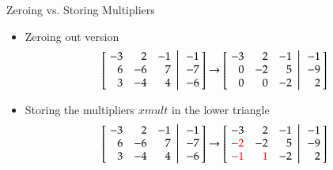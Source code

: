 \documentclass[10pt]{beamer}
\begin{document}
\begin{frame}[fragile]{Zeroing vs. Storing Multipliers}

\begin{itemize}
    \item Zeroing out version 
    $$
      \left[
           \left.\negthickspace\begin{array}{rrr}  -3 &  2 & -1  \\
                                                    6 & -6 &  7 \\
                                                    3 & -4 &  4 \end{array}
           \right|\begin{array}{r} -1 \\ -7 \\ -6 \end{array}\negthickspace\right]\rightarrow \left[
           \left.\negthickspace\begin{array}{rrr}  -3 &  2 & -1 \\
                                                    0 & -2 &  5 \\
                                                    0 &  0 & -2 \end{array}
           \right|\begin{array}{r} -1 \\ -9 \\ 2 \end{array}\negthickspace\right]
    $$
    \item Storing the multipliers $xmult$ in the lower triangle
    $$
      \left[
           \left.\negthickspace\begin{array}{rrr}  -3 &  2 & -1  \\
                                                    6 & -6 &  7 \\
                                                    3 & -4 &  4 \end{array}
           \right|\begin{array}{r} -1 \\ -7 \\ -6 \end{array}\negthickspace\right]\rightarrow \left[
           \left.\negthickspace\begin{array}{rrr}  -3 &  2 & -1 \\
                                                    \textcolor{red}{-2} & -2 &  5 \\
                                                    \textcolor{red}{-1} &  \textcolor{red}{1} & -2 \end{array}
           \right|\begin{array}{r} -1 \\ -9 \\ 2 \end{array}\negthickspace\right]
    $$
\end{itemize}


\end{frame}
\end{document}
